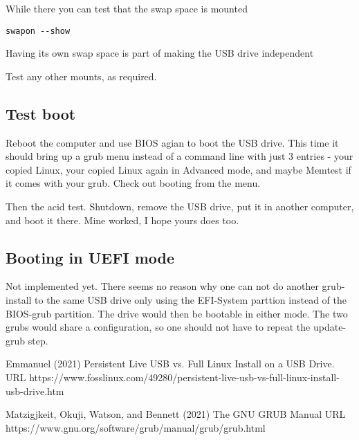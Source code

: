 \documentclass{article}  %
\begin{document}
While there you can test that the swap space is mounted
\begin{verbatim}
swapon --show
\end{verbatim}
Having its own swap space is part of making the USB drive independent

Test any other mounts, as required.

\subsection{Test boot}
Reboot the computer and use BIOS agian to boot the USB drive. This time it should bring up a grub menu instead of a command line with just 3 entries - your copied Linux, your copied Linux again in Advanced mode, and maybe Memtest if it comes with your grub.
Check out booting from the menu.

Then the acid test. Shutdown, remove the USB drive, put it in another computer, and boot it there. Mine worked, I hope yours does too.


\subsection{Booting in UEFI mode}
Not implemented yet. There seems no reason why one can not do another grub-install  to the same USB drive only using the EFI-System parttion instead of the BIOS-grub partition. The drive would then be bootable in either mode. The two grubs would share a configuration, so one should not have to repeat the update-grub step.

\begin{thebibliography}{99}

Emmanuel (2021) Persistent Live USB vs. Full Linux Install on a USB Drive. URL https://www.fosslinux.com/49280/persistent-live-usb-vs-full-linux-install-usb-drive.htm 

Matzigjkeit, Okuji, Watson, and Bennett (2021) The GNU GRUB Manual URL https://www.gnu.org/software/grub/manual/grub/grub.html

\end{thebibliography}
\end{document}
